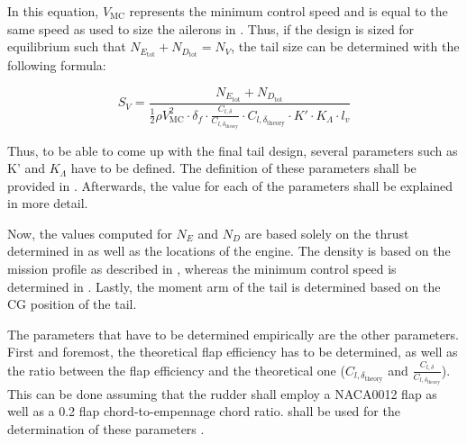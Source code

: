 In this equation, $V_\text{MC}$ represents the minimum control speed and is equal to the same speed as used to size the ailerons in .
Thus, if the design is sized for equilibrium such that $N_{E_\text{tot}}+N_{D_\text{tot}}= N_V$, the tail size can be determined with the following formula:

\begin{equation} \label{eq:S_V_control2}
    S_V=\frac{N_{E_\text{tot}}+N_{D_\text{tot}}}{\frac{1}{2}\rho V_\text{MC}^2\cdot \delta_f \cdot \frac{C_{l,\delta}}{C_{l,\delta_\text{theory}}} \cdot C_{l,\delta_\text{theory}} \cdot K' \cdot K_{\Lambda} \cdot l_v}
\end{equation}

Thus, to be able to come up with the final tail design, several parameters such as K' and $K_{\Lambda}$ have to be defined.
The definition of these parameters shall be provided in .
Afterwards, the value for each of the parameters shall be explained in more detail.

\begin{table}[H]
    \centering
    \caption{Values required to determine the vertical tail size for engine inoperative}
    \label{tab:vert_control}
\end{table}

Now, the values computed for $N_E$ and $N_D$
are based solely on the thrust determined in  as well as the locations of the engine.
The density is based on the mission profile as described in , whereas the minimum control speed is determined in .
Lastly, the moment arm of the tail is determined based on the CG position of the tail.

The parameters that have to be determined empirically are the other parameters.
First and foremost, the theoretical flap efficiency has to be determined, as well as the ratio between the flap efficiency and the theoretical one ($C_{l,\delta_\text{theory}}$ and $\frac{C_{l,\delta}}{C_{l,\delta_\text{theory}}}$). This can be done assuming that the rudder shall employ a NACA0012 flap as well as a 0.2 flap chord-to-empennage chord ratio.
 shall be used for the determination of these parameters \cite{HAW_11}.


